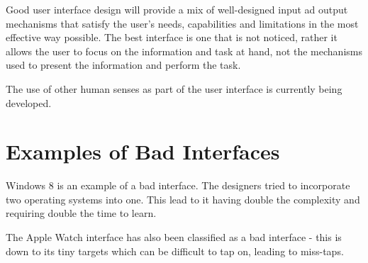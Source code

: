 Good user interface design will provide a mix of well-designed input ad output mechanisms that satisfy the user's needs, capabilities and limitations in the most effective way possible. The best interface is one that is not noticed, rather it allows the user to focus on the information and task at hand, not the mechanisms used to present the information and perform the task.

The use of other human senses as part of the user interface is currently being developed. 

\section{Examples of Bad Interfaces}
Windows 8 is an example of a bad interface. The designers tried to incorporate two operating systems into one. This lead to it having double the complexity and requiring double the time to learn. 

The Apple Watch interface has also been classified as a bad interface - this is down to its tiny targets which can be difficult to tap on, leading to miss-taps. 